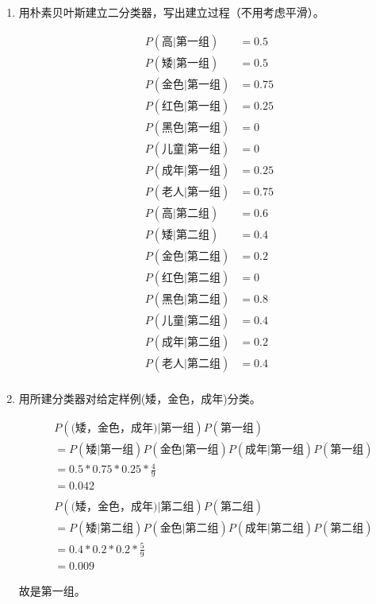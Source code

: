\documentclass[10pt, UTF8]{article}
\begin{document}
\begin{enumerate}
  \item 用朴素贝叶斯建立二分类器，写出建立过程（不用考虑平滑）。
  
  \begin{align*}
    P(\text{高}|\text{第一组}) &= 0.5\\
    P(\text{矮}|\text{第一组}) &= 0.5\\
    P(\text{金色}|\text{第一组}) &= 0.75\\
    P(\text{红色}|\text{第一组}) &= 0.25\\
    P(\text{黑色}|\text{第一组}) &= 0\\
    P(\text{儿童}|\text{第一组}) &= 0\\
    P(\text{成年}|\text{第一组}) &= 0.25\\
    P(\text{老人}|\text{第一组}) &= 0.75\\
    P(\text{高}|\text{第二组}) &= 0.6\\
    P(\text{矮}|\text{第二组}) &= 0.4\\
    P(\text{金色}|\text{第二组}) &= 0.2\\
    P(\text{红色}|\text{第二组}) &= 0\\
    P(\text{黑色}|\text{第二组}) &= 0.8\\
    P(\text{儿童}|\text{第二组}) &= 0.4\\
    P(\text{成年}|\text{第二组}) &= 0.2\\
    P(\text{老人}|\text{第二组}) &= 0.4\\
  \end{align*}
  
  \item 用所建分类器对给定样例(矮，金色，成年)分类。
  
  \begin{align*}
    & P(\text{(矮，金色，成年)}|\text{第一组})P(\text{第一组}) \\
    &= P(\text{矮}|\text{第一组})P(\text{金色}|\text{第一组})P(\text{成年}|\text{第一组})P(\text{第一组}) \\
    &= 0.5 * 0.75 * 0.25 * \frac{4}{9} \\
    &= 0.042 \\
    \\
    & P(\text{(矮，金色，成年)}|\text{第二组})P(\text{第二组}) \\
    &= P(\text{矮}|\text{第二组})P(\text{金色}|\text{第二组})P(\text{成年}|\text{第二组})P(\text{第二组}) \\
    &= 0.4 * 0.2 * 0.2 * \frac{5}{9} \\
    &= 0.009
  \end{align*}
  
  故是第一组。
\end{enumerate}
\end{document}
